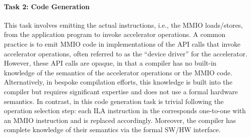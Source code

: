 \paragraph*{Task 2: Code Generation} 
This task involves emitting the actual instructions, i.e., the MMIO loads/stores, from the application program to invoke accelerator operations. 
A common practice is to emit MMIO code in implementations of the API calls that invoke accelerator operations, often referred to as the ``device driver'' for the accelerator. However, these API calls are opaque, in that a compiler has no built-in knowledge of the semantics of the accelerator operations or the MMIO code.  
Alternatively, in bespoke compilation efforts, this knowledge is built into the compiler but requires significant expertise and does not use a formal hardware semantics.
In contrast, in \TLA this code generation task is trivial following the operation selection step: each ILA instruction in the \mapping %
corresponds one-to-one with an MMIO instruction and is replaced accordingly. Moreover, the compiler has complete knowledge of their semantics via the formal SW/HW interface.

